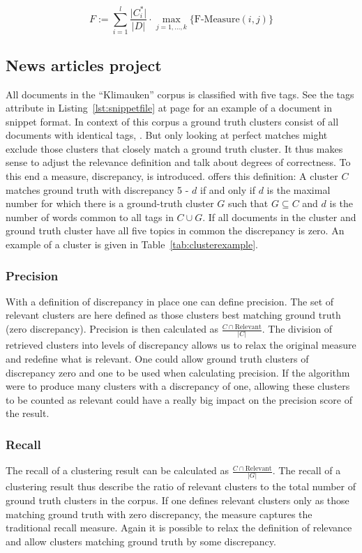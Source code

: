 \begin{displaymath}
F := \sum_{i=1}^{l} \frac{\vert C_i^* \vert}{\vert D \vert} \cdot \max_{j=1,\dots,k} \{\text{F-Measure}(i,j)\}
\end{displaymath}

\subsection{News articles project}
All documents in the ``Klimauken'' corpus is classified with five tags. See the tags attribute in Listing~\ref{lst:snippetfile} at page \pageref{lst:snippetfile} for an example of a document in snippet format. In context of this corpus a ground truth clusters consist of all documents with identical tags, \parencite{Moe2014}. But only looking at perfect matches might exclude those clusters that closely match a ground truth cluster. It thus makes sense to adjust the relevance definition and talk about degrees of correctness. To this end a measure, discrepancy, is introduced. \cite[][666]{Moe2014} offers this definition: A cluster \(C\) matches ground truth with discrepancy 5 - \(d\) if and only if \(d\) is the maximal number for which there is a ground-truth cluster \(G\) such that \(G \subseteq C\) and \(d\) is the number of words common to all tags in \(C \cup G\). If all documents in the cluster and ground truth cluster have all five topics in common the discrepancy is zero. An example of a cluster is given in Table~\ref{tab:clusterexample}.

\subsubsection{Precision}
With a definition of discrepancy in place one can define precision. The set of relevant clusters are here defined as those clusters best matching ground truth (zero discrepancy). Precision is then calculated as \(\frac{C \cap \text{Relevant}}{\vert C \vert}\). The division of retrieved clusters into levels of discrepancy allows us to relax the original measure and redefine what is relevant. One could allow ground truth clusters of discrepancy zero and one to be used when calculating precision. If the algorithm were to produce many clusters with a discrepancy of one, allowing these clusters to be counted as relevant could have a really big impact on the precision score of the result.

\subsubsection{Recall}
The recall of a clustering result can be calculated as \(\frac{C \cap \text{Relevant}}{\vert G \vert}\). The recall of a clustering result thus describe the ratio of relevant clusters to the total number of ground truth clusters in the corpus. If one defines relevant clusters only as those matching ground truth with zero discrepancy, the measure captures the traditional recall measure. Again it is possible to relax the definition of relevance and allow clusters matching ground truth by some discrepancy.

